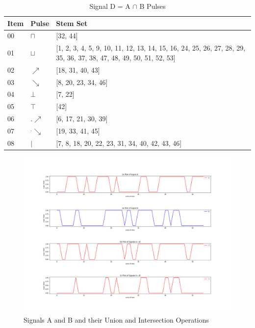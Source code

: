 \documentclass[10pt,journal]{IEEEtran}
\begin{document}
\begin{table}[H] \caption{Signal D = A $\cap$ B Pulses}\centering\begin{tabular}{|p{.4cm}|p{.5cm}|p{6.5cm}|}\hline Item&Pulse &Stem Set\\ \hline 00& \footnotesize$\sqcap$ & \footnotesize[32, 44]\\ \hline 01& \footnotesize$\sqcup$ & \footnotesize[1, 2, 3, 4, 5, 9, 10, 11, 12, 13, 14, 15, 16, 24, 25, 26, 27, 28, 29, 35, 36, 37, 38, 47, 48, 49, 50, 51, 52, 53]\\ \hline 02& \footnotesize$\nearrow$ & \footnotesize[18, 31, 40, 43]\\ \hline 03& \footnotesize$\searrow$ & \footnotesize[8, 20, 23, 34, 46]\\ \hline 04& \footnotesize$\bot$ & \footnotesize[7, 22]\\ \hline 05& \footnotesize$\top$ & \footnotesize[42]\\ \hline 06& \footnotesize$.\nearrow$ & \footnotesize[6, 17, 21, 30, 39]\\ \hline 07& \footnotesize$^.\searrow$ & \footnotesize[19, 33, 41, 45]\\ \hline 08& \footnotesize$|$ & \footnotesize[7, 8, 18, 20, 22, 23, 31, 34, 40, 42, 43, 46]\\ \hline \end{tabular} \end{table} 
\begin{figure}[H]
\centering\includegraphics[width=1\linewidth,height=0.35\textheight]{FG004.png}
\caption{Signals A and B and their Union and Intersection    Operations}
\label{fig:FG004.png}
\end{figure}
\end{document}
